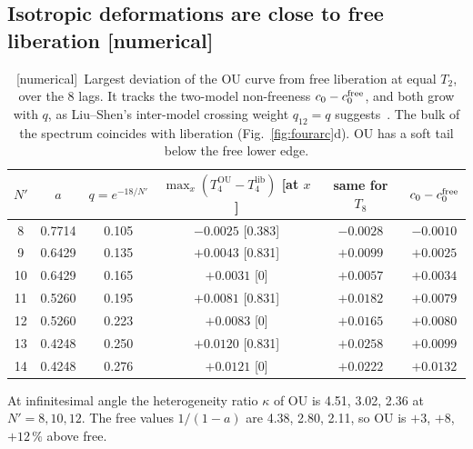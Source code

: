 \documentclass[11pt]{article}
\newcommand{\Np}{N'}
\newcommand{\lib}{\mathrm{lib}}
\newcommand{\OU}{\mathrm{OU}}
\newcommand{\tagbox}[2]{\textsf{\small\color{#1}[#2]}}
\newcommand{\NUM}{\tagbox{cnum}{numerical}}
\theoremstyle{remark}
\begin{document}
\subsection{Isotropic deformations are close to free liberation \NUM}
\begin{table}[!htbp]
\centering\small
\begin{tabular}{@{}cccccc@{}}
\toprule
$\Np$ & $a$ & $q=e^{-18/\Np}$ & $\max_x(T_4^\OU-T_4^\lib)$ [at $x$] & same for $T_8$ & $c_0-c_0^{\rm free}$\\
\midrule
8 & 0.7714 & 0.105 & $-0.0025$ [0.383] & $-0.0028$ & $-0.0010$\\
9 & 0.6429 & 0.135 & $+0.0043$ [0.831] & $+0.0099$ & $+0.0025$\\
10 & 0.6429 & 0.165 & $+0.0031$ [0] & $+0.0057$ & $+0.0034$\\
11 & 0.5260 & 0.195 & $+0.0081$ [0.831] & $+0.0182$ & $+0.0079$\\
12 & 0.5260 & 0.223 & $+0.0083$ [0] & $+0.0165$ & $+0.0080$\\
13 & 0.4248 & 0.250 & $+0.0120$ [0.831] & $+0.0258$ & $+0.0099$\\
14 & 0.4248 & 0.276 & $+0.0121$ [0] & $+0.0222$ & $+0.0132$\\
\bottomrule
\end{tabular}
\caption{\NUM\ Largest deviation of the OU curve from free liberation at equal $T_2$, over the 8 lags. It tracks the
two-model non-freeness $c_0-c_0^{\rm free}$, and both grow with $q$, as Liu--Shen's inter-model crossing weight
$q_{12}=q$ suggests~\cite{LiuShen}. The bulk of the spectrum coincides with liberation (Fig.~\ref{fig:fourarc}d). OU has
a soft tail below the free lower edge.}
\label{tab:oulib}
\end{table}
At infinitesimal angle the heterogeneity ratio $\kappa$ of OU is 4.51, 3.02, 2.36 at $\Np=8,10,12$. The free values
$1/(1-a)$ are 4.38, 2.80, 2.11, so OU is $+3$, $+8$, $+12\,\%$ above free.
\end{document}

